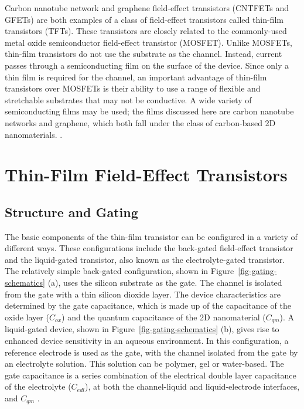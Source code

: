 \documentclass[
  a4paper,
]{scrbook}
\begin{document}
Carbon nanotube network and graphene field-effect transistors (CNTFETs
and GFETs) are both examples of a class of field-effect transistors
called thin-film transistors (TFTs). These transistors are closely
related to the commonly-used metal oxide semiconductor field-effect
transistor (MOSFET). Unlike MOSFETs, thin-film transistors do not use
the substrate as the channel. Instead, current passes through a
semiconducting film on the surface of the device. Since only a thin film
is required for the channel, an important advantage of thin-film
transistors over MOSFETs is their ability to use a range of flexible and
stretchable substrates that may not be conductive. A wide variety of
semiconducting films may be used; the films discussed here are carbon
nanotube networks and graphene, which both fall under the class of
carbon-based 2D nanomaterials. \autocite{Sun2013,Shkodra2021}.

\hypertarget{sec-general-FETs}{%
\section{Thin-Film Field-Effect Transistors}\label{sec-general-FETs}}

\hypertarget{sec-gating}{%
\subsection{Structure and Gating}\label{sec-gating}}

The basic components of the thin-film transistor can be configured in a
variety of different ways. These configurations include the back-gated
field-effect transistor and the liquid-gated transistor, also known as
the electrolyte-gated transistor. The relatively simple back-gated
configuration, shown in Figure~\ref{fig-gating-schematics} (a), uses the
silicon substrate as the gate. The channel is isolated from the gate
with a thin silicon dioxide layer. The device characteristics are
determined by the gate capacitance, which is made up of the capacitance
of the oxide layer (\(C_{ox}\)) and the quantum capacitance
\autocite{Xia2009} of the 2D nanomaterial (\(C_{qm}\)). A liquid-gated
device, shown in Figure~\ref{fig-gating-schematics} (b), gives rise to
enhanced device sensitivity in an aqueous environment. In this
configuration, a reference electrode is used as the gate, with the
channel isolated from the gate by an electrolyte solution. This solution
can be polymer, gel or water-based. The gate capacitance is a series
combination of the electrical double layer capacitance of the
electrolyte (\(C_{edl}\)), at both the channel-liquid and
liquid-electrode interfaces, and \(C_{qm}\)
\autocite{Shkodra2021,Li2023}.
\end{document}
